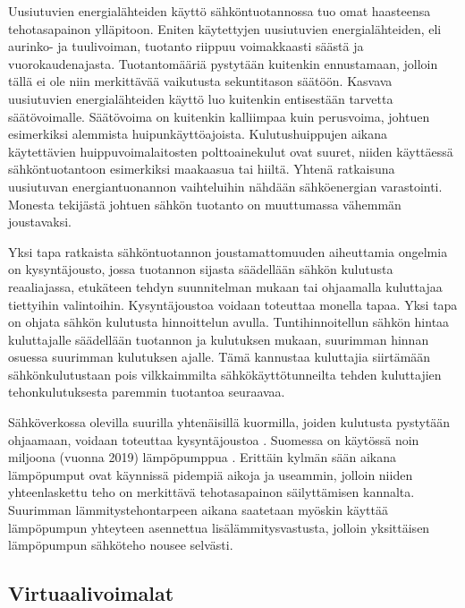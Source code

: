   Uusiutuvien energialähteiden käyttö sähköntuotannossa tuo omat haasteensa tehotasapainon ylläpitoon. Eniten käytettyjen uusiutuvien energialähteiden, eli aurinko- ja tuulivoiman, tuotanto riippuu voimakkaasti säästä ja vuorokaudenajasta. Tuotantomääriä pystytään kuitenkin ennustamaan, jolloin tällä ei ole niin merkittävää vaikutusta sekuntitason säätöön. Kasvava uusiutuvien energialähteiden käyttö luo kuitenkin entisestään tarvetta säätövoimalle. \parencite{energiateollisuus} Säätövoima on kuitenkin kalliimpaa kuin perusvoima, johtuen esimerkiksi alemmista huipunkäyttöajoista. Kulutushuippujen aikana käytettävien huippuvoimalaitosten polttoainekulut ovat suuret, niiden käyttäessä sähköntuotantoon esimerkiksi maakaasua tai hiiltä. Yhtenä ratkaisuna uusiutuvan energiantuonannon vaihteluihin nähdään sähköenergian varastointi. Monesta tekijästä johtuen sähkön tuotanto on muuttumassa vähemmän joustavaksi.

  Yksi tapa ratkaista sähköntuotannon joustamattomuuden aiheuttamia ongelmia on kysyntäjousto, jossa tuotannon sijasta säädellään sähkön kulutusta reaaliajassa, etukäteen tehdyn suunnitelman mukaan tai ohjaamalla kuluttajaa tiettyihin valintoihin. Kysyntäjoustoa voidaan toteuttaa monella tapaa. \parencite{fingrid} Yksi tapa on ohjata sähkön kulutusta hinnoittelun avulla. Tuntihinnoitellun sähkön hintaa kuluttajalle säädellään tuotannon ja kulutuksen mukaan, suurimman hinnan osuessa suurimman kulutuksen ajalle. Tämä kannustaa kuluttajia siirtämään sähkönkulutustaan pois vilkkaimmilta sähkökäyttötunneilta tehden kuluttajien tehonkulutuksesta paremmin tuotantoa seuraavaa.

  Sähköverkossa olevilla suurilla yhtenäisillä kuormilla, joiden kulutusta pystytään ohjaamaan, voidaan toteuttaa kysyntäjoustoa \parencite{fingrid}. Suomessa on käytössä noin miljoona (vuonna 2019) lämpöpumppua \parencite{sulpu}. Erittäin kylmän sään aikana lämpöpumput ovat käynnissä pidempiä aikoja ja useammin, jolloin niiden yhteenlaskettu teho on merkittävä tehotasapainon säilyttämisen kannalta. Suurimman lämmitystehontarpeen aikana saatetaan myöskin käyttää lämpöpumpun yhteyteen asennettua lisälämmitysvastusta, jolloin yksittäisen lämpöpumpun sähköteho nousee selvästi.

\subsection{Virtuaalivoimalat}

